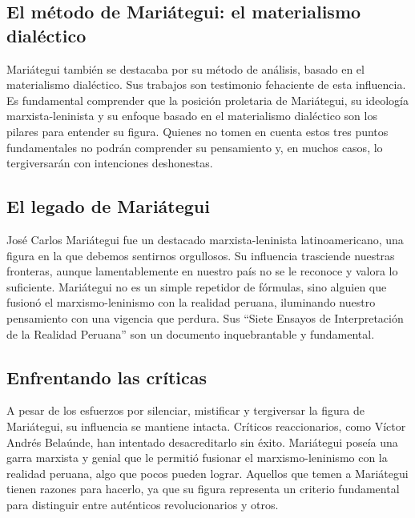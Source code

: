 \documentclass[
  a4paper,
]{article}
\begin{document}
\hypertarget{el-muxe9todo-de-mariuxe1tegui-el-materialismo-dialuxe9ctico}{%
\subsection{El método de Mariátegui: el materialismo
dialéctico}\label{el-muxe9todo-de-mariuxe1tegui-el-materialismo-dialuxe9ctico}}

Mariátegui también se destacaba por su método de análisis, basado en el
materialismo dialéctico. Sus trabajos son testimonio fehaciente de esta
influencia. Es fundamental comprender que la posición proletaria de
Mariátegui, su ideología marxista-leninista y su enfoque basado en el
materialismo dialéctico son los pilares para entender su figura. Quienes
no tomen en cuenta estos tres puntos fundamentales no podrán comprender
su pensamiento y, en muchos casos, lo tergiversarán con intenciones
deshonestas.

\hypertarget{el-legado-de-mariuxe1tegui}{%
\subsection{El legado de Mariátegui}\label{el-legado-de-mariuxe1tegui}}

José Carlos Mariátegui fue un destacado marxista-leninista
latinoamericano, una figura en la que debemos sentirnos orgullosos. Su
influencia trasciende nuestras fronteras, aunque lamentablemente en
nuestro país no se le reconoce y valora lo suficiente. Mariátegui no es
un simple repetidor de fórmulas, sino alguien que fusionó el
marxismo-leninismo con la realidad peruana, iluminando nuestro
pensamiento con una vigencia que perdura. Sus ``Siete Ensayos de
Interpretación de la Realidad Peruana'' son un documento inquebrantable
y fundamental.

\hypertarget{enfrentando-las-cruxedticas}{%
\subsection{Enfrentando las
críticas}\label{enfrentando-las-cruxedticas}}

A pesar de los esfuerzos por silenciar, mistificar y tergiversar la
figura de Mariátegui, su influencia se mantiene intacta. Críticos
reaccionarios, como Víctor Andrés Belaúnde, han intentado desacreditarlo
sin éxito. Mariátegui poseía una garra marxista y genial que le permitió
fusionar el marxismo-leninismo con la realidad peruana, algo que pocos
pueden lograr. Aquellos que temen a Mariátegui tienen razones para
hacerlo, ya que su figura representa un criterio fundamental para
distinguir entre auténticos revolucionarios y otros.
\end{document}
